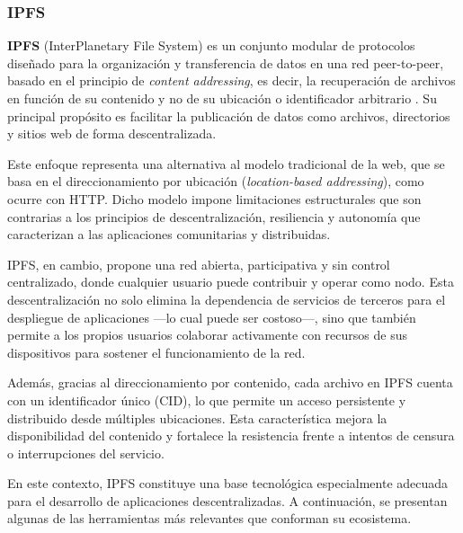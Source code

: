 \subsubsection{IPFS}

\textbf{IPFS} (InterPlanetary File System) es un conjunto modular de protocolos diseñado para la organización y transferencia de datos en una red peer-to-peer, basado en el principio de \textit{content addressing}, es decir, la recuperación de archivos en función de su contenido y no de su ubicación o identificador arbitrario \cite{ipfs}. Su principal propósito es facilitar la publicación de datos como archivos, directorios y sitios web de forma descentralizada.

Este enfoque representa una alternativa al modelo tradicional de la web, que se basa en el direccionamiento por ubicación (\textit{location-based addressing}), como ocurre con HTTP. Dicho modelo impone limitaciones estructurales que son contrarias a los principios de descentralización, resiliencia y autonomía que caracterizan a las aplicaciones comunitarias y distribuidas.

IPFS, en cambio, propone una red abierta, participativa y sin control centralizado, donde cualquier usuario puede contribuir y operar como nodo. Esta descentralización no solo elimina la dependencia de servicios de terceros para el despliegue de aplicaciones —lo cual puede ser costoso—, sino que también permite a los propios usuarios colaborar activamente con recursos de sus dispositivos para sostener el funcionamiento de la red.

Además, gracias al direccionamiento por contenido, cada archivo en IPFS cuenta con un identificador único (CID), lo que permite un acceso persistente y distribuido desde múltiples ubicaciones. Esta característica mejora la disponibilidad del contenido y fortalece la resistencia frente a intentos de censura o interrupciones del servicio.

En este contexto, IPFS constituye una base tecnológica especialmente adecuada para el desarrollo de aplicaciones descentralizadas. A continuación, se presentan algunas de las herramientas más relevantes que conforman su ecosistema.

